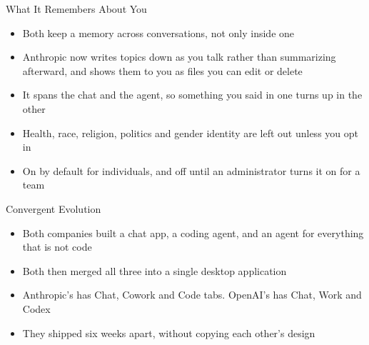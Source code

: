 \documentclass[aspectratio=169]{beamer}
\begin{document}
\begin{frame}{What It Remembers About You}
    \begin{itemize}\setlength{\itemsep}{6pt}
        \item Both keep a memory across conversations, not only inside one
        \item Anthropic now writes topics down as you talk rather than summarizing
              afterward, and shows them to you as files you can edit or delete
        \item It spans the chat and the agent, so something you said in one turns up in
              the other
        \item Health, race, religion, politics and gender identity are left out unless you
              opt in
        \item On by default for individuals, and off until an administrator turns it on for
              a team
    \end{itemize}
\end{frame}

\begin{frame}{Convergent Evolution}
    \begin{itemize}
        \item Both companies built a chat app, a coding agent, and an agent for everything
              that is not code
        \item Both then merged all three into a single desktop application
        \item Anthropic's has Chat, Cowork and Code tabs. OpenAI's has Chat, Work and Codex
        \item They shipped six weeks apart, without copying each other's design
    \end{itemize}
\end{frame}
\end{document}
